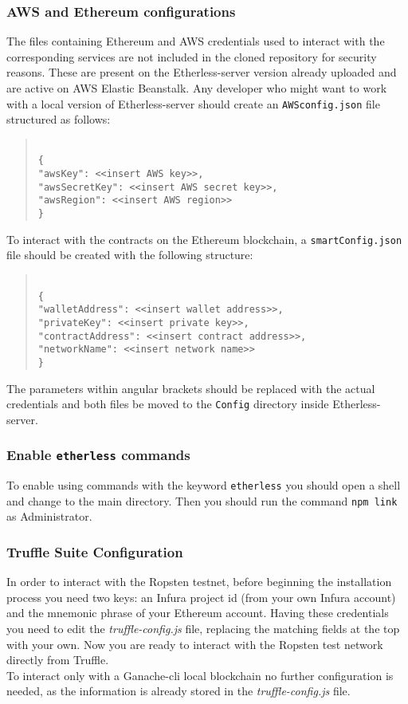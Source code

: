 \subsubsection{AWS and Ethereum configurations}
The files containing Ethereum and AWS credentials used to interact with the corresponding services are not included in the cloned repository for security reasons. These are present on the Etherless-server version already uploaded and are active on AWS Elastic Beanstalk.
Any developer who might want to work with a local version of Etherless-server should create an \texttt{AWSconfig.json} file structured as follows:
\begin{quote}
\texttt{ \\
	\{\\
		"awsKey": <<insert AWS key>>, \\
		"awsSecretKey": <<insert AWS secret key>>, \\
		"awsRegion": <<insert AWS region>> \\
	\}\\
}
\end{quote}
To interact with the contracts on the Ethereum blockchain, a \texttt{smartConfig.json} file should be created with the following structure:
\begin{quote}
\texttt{ \\
	\{\\
	"walletAddress": <<insert wallet address>>, \\
	"privateKey": <<insert private key>>, \\
	"contractAddress": <<insert contract address>>, \\
	"networkName": <<insert network name>> \\
	\}\\
}
\end{quote}
The parameters within angular brackets should be replaced with the actual credentials and both files be moved to the \texttt{Config} directory inside Etherless-server.
\subsubsection{Enable \texttt{etherless} commands}
To enable using commands with the keyword \texttt{etherless} you should open a shell and change to the main directory. Then you should run the command \texttt{npm link} as Administrator.
\subsubsection{Truffle Suite Configuration}
	In order to interact with the Ropsten testnet, before beginning the installation process you need two keys: an Infura project id (from your own Infura account) and the mnemonic phrase of your Ethereum account. Having these credentials you need to edit the \textit{truffle-config.js} file, replacing the matching fields at the top with your own. Now you are ready to interact with the Ropsten test network directly from Truffle.\\
	To interact only with a Ganache-cli local blockchain no further configuration is needed, as the information is already stored in the \textit{truffle-config.js} file.
